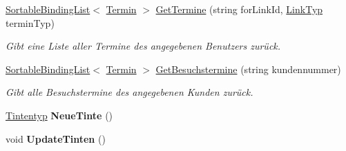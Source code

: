 \begin{DoxyCompactItemize}
\item 
\hyperlink{class_products_1_1_common_1_1_sortable_binding_list}{Sortable\+Binding\+List}$<$ \hyperlink{class_products_1_1_model_1_1_entities_1_1_termin}{Termin} $>$ \hyperlink{class_products_1_1_model_1_1_model_service_ada09135e0d1808d8808b698417ecf4c9}{Get\+Termine} (string for\+Link\+Id, \hyperlink{namespace_products_1_1_model_a0ea8a130b9a610541b442971b91cbc31}{Link\+Typ} termin\+Typ)
\begin{DoxyCompactList}\small\item\em Gibt eine Liste aller Termine des angegebenen Benutzers zurück. \end{DoxyCompactList}\item 
\hyperlink{class_products_1_1_common_1_1_sortable_binding_list}{Sortable\+Binding\+List}$<$ \hyperlink{class_products_1_1_model_1_1_entities_1_1_termin}{Termin} $>$ \hyperlink{class_products_1_1_model_1_1_model_service_a8bbac419debecf92d2144efad343174b}{Get\+Besuchstermine} (string kundennummer)
\begin{DoxyCompactList}\small\item\em Gibt alle Besuchstermine des angegebenen Kunden zurück. \end{DoxyCompactList}\item 
\hyperlink{class_products_1_1_model_1_1_entities_1_1_tintentyp}{Tintentyp} {\bfseries Neue\+Tinte} ()\hypertarget{class_products_1_1_model_1_1_model_service_a9e77ec5740819cf194b481131177465d}{}\label{class_products_1_1_model_1_1_model_service_a9e77ec5740819cf194b481131177465d}

\item 
void {\bfseries Update\+Tinten} ()\hypertarget{class_products_1_1_model_1_1_model_service_ab396d760d808654c73c33d6f77ba43cc}{}\label{class_products_1_1_model_1_1_model_service_ab396d760d808654c73c33d6f77ba43cc}


\end{DoxyCompactItemize}
